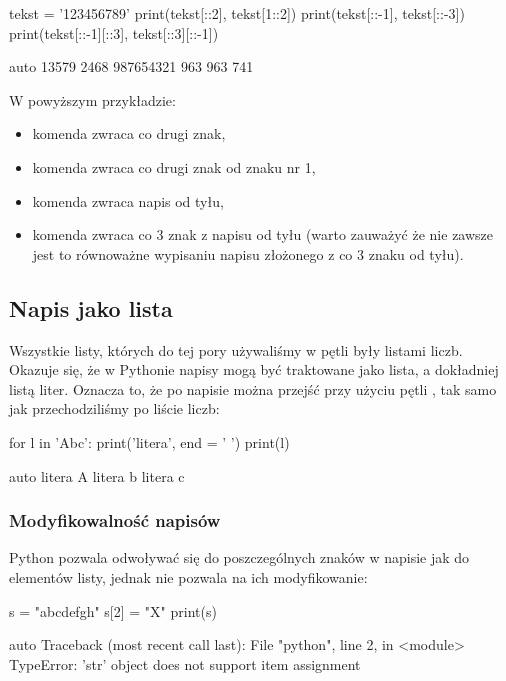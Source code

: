 \documentclass{pdfBooklets}
\begin{document}
\begin{CodeFrame}[python]{.7\textwidth}
tekst = '123456789'
print(tekst[::2], tekst[1::2])
print(tekst[::-1], tekst[::-3])
print(tekst[::-1][::3], tekst[::3][::-1])
\end{CodeFrame}
\begin{CodeFrame}{auto}
13579 2468
987654321 963
963 741
\end{CodeFrame}

\pagebreak[2]\noindent
W powyższym przykładzie:
\begin{itemize}
\item komenda  zwraca co drugi znak,
\item komenda  zwraca co drugi znak od znaku nr 1,
\item komenda  zwraca napis od tyłu,
\item komenda  zwraca co 3 znak z napisu od tyłu (warto zauważyć że nie zawsze jest to równoważne wypisaniu napisu złożonego z co 3 znaku od tyłu).
\end{itemize}

\subsection{Napis jako lista}

Wszystkie listy, których do tej pory używaliśmy w pętli  były listami liczb.
Okazuje się, że w Pythonie napisy mogą być traktowane jako lista, a dokładniej listą liter. 
Oznacza to, że po napisie można przejść przy użyciu pętli , tak samo jak przechodziliśmy po liście liczb:

\begin{CodeFrame}[python]{0.50\textwidth}
for l in 'Abc':
    print('litera', end = ' ')
    print(l)
\end{CodeFrame}
\begin{CodeFrame}{auto}
litera A
litera b
litera c
\end{CodeFrame}

\subsubsection{Modyfikowalność napisów}

Python pozwala odwoływać się do poszczególnych znaków w napisie jak do elementów listy, jednak nie pozwala na ich modyfikowanie:

\begin{CodeFrame}[python]{0.25\textwidth}
s = "abcdefgh"
s[2] = "X"
print(s)
\end{CodeFrame}
\begin{CodeFrame}{auto}
Traceback (most recent call last):
  File "python", line 2, in <module>
TypeError: 'str' object does not support item assignment
\end{CodeFrame}
\end{document}
